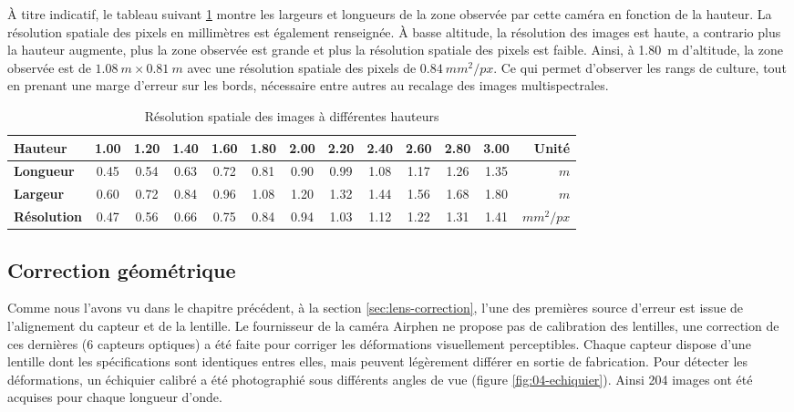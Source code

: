 \documentclass[../thesis.tex]{subfiles}
\begin{document}
    À titre indicatif, le tableau suivant \ref{tab:04-acquisition-resolution} montre les largeurs et longueurs de la zone observée par cette caméra en fonction de la hauteur. La résolution spatiale des pixels en millimètres est également renseignée. À basse altitude, la résolution des images est haute, a contrario plus la hauteur augmente, plus la zone observée est grande et plus la résolution spatiale des pixels est faible. Ainsi, à \SI{1.80}{m} d'altitude, la zone observée est de $\SI{1.08}{m} \times \SI{0.81}{m}$ avec une résolution spatiale des pixels de $\SI{0.84}{mm^2/px}$. Ce qui permet d'observer les rangs de culture, tout en prenant une marge d'erreur sur les bords, nécessaire entre autres au recalage des images multispectrales.
    
    \vfill
    \begin{table}[H]
        \centering
        \begin{tabular}{| l | c c c c c c c c c c c | r |}  \hline
            \textbf{Hauteur}  & 1.00 & 1.20 & 1.40 & 1.60 & 1.80 & 2.00 & 2.20 & 2.40 & 2.60 & 2.80 & 3.00 & \textbf{Unité} \\ \hline
            \textbf{Longueur} & 0.45 & 0.54 & 0.63 & 0.72 & 0.81 & 0.90 & 0.99 & 1.08 & 1.17 & 1.26 & 1.35 & $m$\\
            \textbf{Largeur}  & 0.60 & 0.72 & 0.84 & 0.96 & 1.08 & 1.20 & 1.32 & 1.44 & 1.56 & 1.68 & 1.80 & $m$ \\ \hline
            \textbf{Résolution} & 0.47 & 0.56 & 0.66 & 0.75 & 0.84 & 0.94 & 1.03 & 1.12 & 1.22 & 1.31 & 1.41 & $mm^2/px$ \\ \hline
        \end{tabular}
        \caption{Résolution spatiale des images à différentes hauteurs}
        \label{tab:04-acquisition-resolution}
    \end{table}
    \vfill
    
    \newpage
    \subsection{Correction géométrique}
    \label{sec:acquisition-calibration-lens}
    
    Comme nous l'avons vu dans le chapitre précédent, à la section \ref{sec:lens-correction}, l'une des premières source d'erreur est issue de l'alignement du capteur et de la lentille. Le fournisseur de la caméra Airphen ne propose pas de calibration des lentilles, une correction de ces dernières (6 capteurs optiques) a été faite pour corriger les déformations visuellement perceptibles. Chaque capteur dispose d'une lentille dont les spécifications sont identiques entres elles, mais peuvent légèrement différer en sortie de fabrication. Pour détecter les déformations, un échiquier calibré a été photographié sous différents angles de vue (figure \ref{fig:04-echiquier}). Ainsi 204 images ont été acquises pour chaque longueur d'onde.
    
\end{document}
